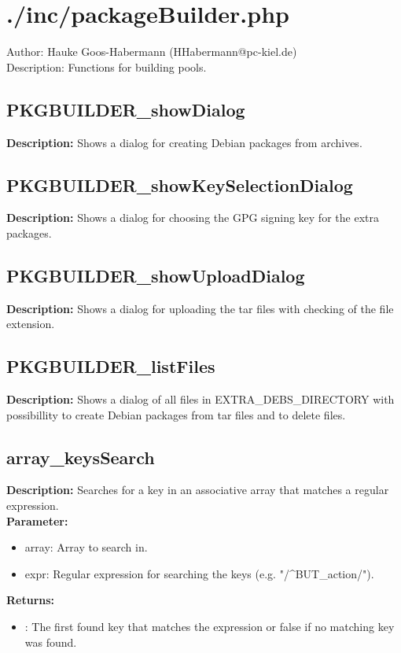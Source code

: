 \newpage\section{./inc/packageBuilder.php}
 Author: Hauke Goos-Habermann (HHabermann@pc-kiel.de)\\
 Description: Functions for building pools.\\

\subsection{PKGBUILDER\_showDialog}
\textbf{Description:} Shows a dialog for creating Debian packages from archives.\\

\subsection{PKGBUILDER\_showKeySelectionDialog}
\textbf{Description:} Shows a dialog for choosing the GPG signing key for the extra packages.\\

\subsection{PKGBUILDER\_showUploadDialog}
\textbf{Description:} Shows a dialog for uploading the tar files with checking of the file extension.\\

\subsection{PKGBUILDER\_listFiles}
\textbf{Description:} Shows a dialog of all files in EXTRA\_DEBS\_DIRECTORY with possibillity to create Debian packages from tar files and to delete files.\\

\subsection{array\_keysSearch}
\textbf{Description:} Searches for a key in an associative array that matches a regular expression.\\
\textbf{Parameter:}
\begin{itemize}
\item array: Array to search in.
\item expr: Regular expression for searching the keys (e.g. "/^BUT\_action/").
\end{itemize}
\textbf{Returns:}
\begin{itemize}
\item : The first found key that matches the expression or false if no matching key was found.
\end{itemize}


